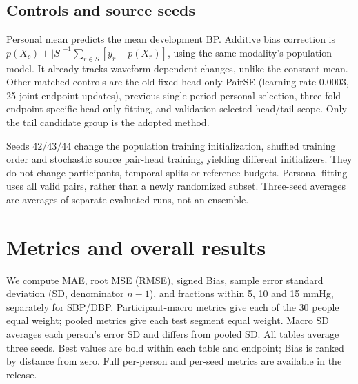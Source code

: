 \documentclass[conference]{IEEEtran}
\begin{document}
\subsection{Controls and source seeds}
Personal mean predicts the mean development BP. Additive bias correction is
$p(X_c)+|S|^{-1}\sum_{r\in S}[y_r-p(X_r)]$, using the same modality's population
model. It already tracks waveform-dependent changes, unlike the constant mean.
Other matched controls are the old fixed head-only PairSE (learning rate
0.0003, 25 joint-endpoint updates), previous single-period personal selection,
three-fold endpoint-specific head-only fitting, and validation-selected head/tail
scope. Only the tail candidate group is the adopted method.

Seeds 42/43/44 change the population training initialization, shuffled training
order and stochastic source pair-head training, yielding different initializers.
They do not change participants, temporal splits or reference budgets.
Personal fitting uses all valid pairs, rather than a newly randomized subset.
Three-seed averages are averages of separate evaluated runs, not an ensemble.

\section{Metrics and overall results}
We compute MAE, root MSE (RMSE), signed Bias, sample error standard deviation
(SD, denominator $n-1$), and fractions within 5, 10 and 15 mmHg, separately for
SBP/DBP. Participant-macro metrics give each of the 30 people equal weight;
pooled metrics give each test segment equal weight. Macro SD averages each
person's error SD and differs from pooled SD. All tables average three seeds.
Best values are bold within each table and endpoint; Bias is ranked by distance
from zero. Full per-person and per-seed metrics are available in the release.
\end{document}
